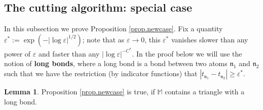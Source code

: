 \documentclass[10pt, reqno]{amsart}
\newcommand{\Mb}{\mathbb M}
\newcommand{\nf}{\mathfrak n}
\theoremstyle{definition}
\newtheorem{lemma}[theorem]{Lemma}
\theoremstyle{remark}
\numberwithin{equation}{section}
\begin{document}
\subsection{The cutting algorithm: special case}\label{sec.newcase} In this subsection we prove Proposition \ref{prop.newcase}. Fix a quantity $\varepsilon^*:=\exp(-|\log\varepsilon|^{1/2})$; note that as $\varepsilon\to 0$, this $\varepsilon^*$ vanishes slower than any power of $\varepsilon$ and faster than any $|\log\varepsilon|^{-C^*}$. In the proof below we will use the notion of \textbf{long bonds}, where a long bond is a bond between two atoms $\nf_1$ and $\nf_2$ such that we have the restriction (by indicator functions) that $|t_{\nf_1}-t_{\nf_2}|\geq\varepsilon^*$.
\begin{lemma} Proposition \ref{prop.newcase} is true, if $\Mb$ contains a triangle with a long bond.
\label{lem.newlem}
\end{lemma}
\end{document}
